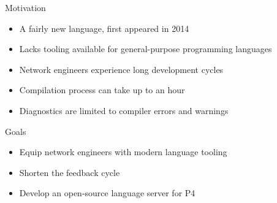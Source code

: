 \documentclass[aspectratio=169]{beamer}
\begin{document}
\begin{frame}{Motivation}
	\begin{itemize}
		\item A fairly new language, first appeared in 2014
		\item \alert{Lacks tooling} available for general-purpose programming
			languages \pause
		\item Network engineers experience long development cycles
		\item Compilation process can take up to an hour
		\item Diagnostics are limited to compiler errors and warnings
	\end{itemize}
\end{frame}

\begin{frame}{Goals}
	\begin{itemize}
		\item Equip network engineers with modern language tooling \pause
		\item Shorten the feedback cycle \pause
		\item Develop an open-source \alert{language server} for P4
	\end{itemize}
\end{frame}
\end{document}
